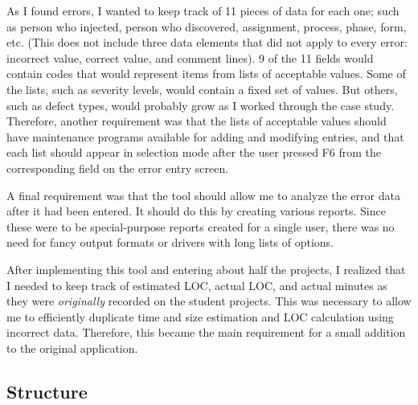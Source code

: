 As I found errors, I wanted to keep track of 11 pieces of data for each
one; such as person who injected, person who discovered, assignment,
process, phase, form, etc.  (This does not include three data elements that
did not apply to every error: incorrect value, correct value, and comment
lines).  9 of the 11 fields would contain codes that would represent items
from lists of acceptable values.  Some of the lists, such as severity
levels, would contain a fixed set of values.  But others, such as defect
types, would probably grow as I worked through the case study.  Therefore,
another requirement was that the lists of acceptable values should have
maintenance programs available for adding and modifying entries, and that
each list should appear in selection mode after the user pressed F6 from
the corresponding field on the error entry screen.

A final requirement was that the tool should allow me to analyze the error
data after it had been entered.  It should do this by creating various
reports.  Since these were to be special-purpose reports created for a
single user, there was no need for fancy output formats or drivers
with long lists of options.

After implementing this tool and entering about half the projects, I
realized that I needed to keep track of estimated LOC, actual LOC, and
actual minutes as they were {\it originally} recorded on the student
projects.  This was necessary to allow me to efficiently duplicate time and
size estimation and LOC calculation using incorrect data.  Therefore, this
became the main requirement for a small addition to the original
application.

\subsection{Structure}
 

